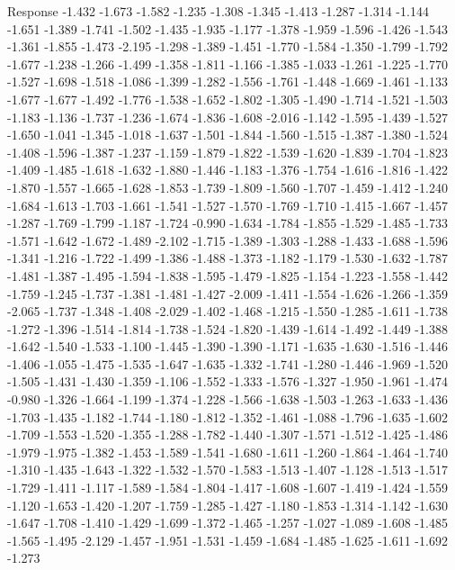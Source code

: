 \documentclass[9pt]{article}
\theoremstyle{plain}
\theoremstyle{definition}
\theoremstyle{remark}
\numberwithin{equation}{section}
\begin{document}
Response
-1.432
-1.673
-1.582
-1.235
-1.308
-1.345
-1.413
-1.287
-1.314
-1.144
-1.651
-1.389
-1.741
-1.502
-1.435
-1.935
-1.177
-1.378
-1.959
-1.596
-1.426
-1.543
-1.361
-1.855
-1.473
-2.195
-1.298
-1.389
-1.451
-1.770
-1.584
-1.350
-1.799
-1.792
-1.677
-1.238
-1.266
-1.499
-1.358
-1.811
-1.166
-1.385
-1.033
-1.261
-1.225
-1.770
-1.527
-1.698
-1.518
-1.086
-1.399
-1.282
-1.556
-1.761
-1.448
-1.669
-1.461
-1.133
-1.677
-1.677
-1.492
-1.776
-1.538
-1.652
-1.802
-1.305
-1.490
-1.714
-1.521
-1.503
-1.183
-1.136
-1.737
-1.236
-1.674
-1.836
-1.608
-2.016
-1.142
-1.595
-1.439
-1.527
-1.650
-1.041
-1.345
-1.018
-1.637
-1.501
-1.844
-1.560
-1.515
-1.387
-1.380
-1.524
-1.408
-1.596
-1.387
-1.237
-1.159
-1.879
-1.822
-1.539
-1.620
-1.839
-1.704
-1.823
-1.409
-1.485
-1.618
-1.632
-1.880
-1.446
-1.183
-1.376
-1.754
-1.616
-1.816
-1.422
-1.870
-1.557
-1.665
-1.628
-1.853
-1.739
-1.809
-1.560
-1.707
-1.459
-1.412
-1.240
-1.684
-1.613
-1.703
-1.661
-1.541
-1.527
-1.570
-1.769
-1.710
-1.415
-1.667
-1.457
-1.287
-1.769
-1.799
-1.187
-1.724
-0.990
-1.634
-1.784
-1.855
-1.529
-1.485
-1.733
-1.571
-1.642
-1.672
-1.489
-2.102
-1.715
-1.389
-1.303
-1.288
-1.433
-1.688
-1.596
-1.341
-1.216
-1.722
-1.499
-1.386
-1.488
-1.373
-1.182
-1.179
-1.530
-1.632
-1.787
-1.481
-1.387
-1.495
-1.594
-1.838
-1.595
-1.479
-1.825
-1.154
-1.223
-1.558
-1.442
-1.759
-1.245
-1.737
-1.381
-1.481
-1.427
-2.009
-1.411
-1.554
-1.626
-1.266
-1.359
-2.065
-1.737
-1.348
-1.408
-2.029
-1.402
-1.468
-1.215
-1.550
-1.285
-1.611
-1.738
-1.272
-1.396
-1.514
-1.814
-1.738
-1.524
-1.820
-1.439
-1.614
-1.492
-1.449
-1.388
-1.642
-1.540
-1.533
-1.100
-1.445
-1.390
-1.390
-1.171
-1.635
-1.630
-1.516
-1.446
-1.406
-1.055
-1.475
-1.535
-1.647
-1.635
-1.332
-1.741
-1.280
-1.446
-1.969
-1.520
-1.505
-1.431
-1.430
-1.359
-1.106
-1.552
-1.333
-1.576
-1.327
-1.950
-1.961
-1.474
-0.980
-1.326
-1.664
-1.199
-1.374
-1.228
-1.566
-1.638
-1.503
-1.263
-1.633
-1.436
-1.703
-1.435
-1.182
-1.744
-1.180
-1.812
-1.352
-1.461
-1.088
-1.796
-1.635
-1.602
-1.709
-1.553
-1.520
-1.355
-1.288
-1.782
-1.440
-1.307
-1.571
-1.512
-1.425
-1.486
-1.979
-1.975
-1.382
-1.453
-1.589
-1.541
-1.680
-1.611
-1.260
-1.864
-1.464
-1.740
-1.310
-1.435
-1.643
-1.322
-1.532
-1.570
-1.583
-1.513
-1.407
-1.128
-1.513
-1.517
-1.729
-1.411
-1.117
-1.589
-1.584
-1.804
-1.417
-1.608
-1.607
-1.419
-1.424
-1.559
-1.120
-1.653
-1.420
-1.207
-1.759
-1.285
-1.427
-1.180
-1.853
-1.314
-1.142
-1.630
-1.647
-1.708
-1.410
-1.429
-1.699
-1.372
-1.465
-1.257
-1.027
-1.089
-1.608
-1.485
-1.565
-1.495
-2.129
-1.457
-1.951
-1.531
-1.459
-1.684
-1.485
-1.625
-1.611
-1.692
-1.273
\end{document}
